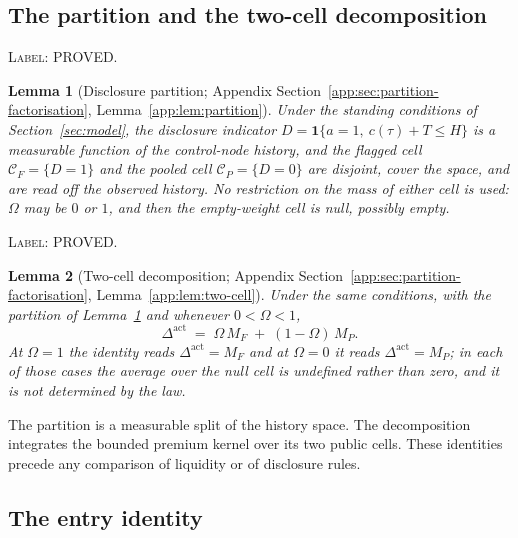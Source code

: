 \documentclass[11pt]{article}
\newtheorem{lemma}{Lemma}
\newcommand{\ind}{\mathbf{1}}
\newcommand{\Dact}{\Delta^{\mathrm{act}}}
\begin{document}
\subsection{The partition and the two-cell decomposition}
\label{sec:partition}

\noindent\textsc{Label: PROVED.}\par
\begin{lemma}[Disclosure partition; Appendix Section~\ref{app:sec:partition-factorisation}, Lemma~\ref{app:lem:partition}]
\label{lem:partition}
Under the standing conditions of Section~\ref{sec:model}, the disclosure indicator
$D = \ind\{a = 1,\ c(\tau) + T \le H\}$ is a measurable function of the control-node history,
and the flagged cell $\mathcal C_F = \{D = 1\}$ and the pooled cell $\mathcal C_P = \{D = 0\}$
are disjoint, cover the space, and are read off the observed history. No restriction on the
mass of either cell is used: $\Omega$ may be $0$ or $1$, and then the empty-weight cell is
null, possibly empty.
\end{lemma}

\noindent\textsc{Label: PROVED.}\par
\begin{lemma}[Two-cell decomposition; Appendix Section~\ref{app:sec:partition-factorisation}, Lemma~\ref{app:lem:two-cell}]
\label{lem:two-cell}
Under the same conditions, with the partition of Lemma~\ref{lem:partition} and whenever
$0 < \Omega < 1$,
\[
  \Dact \;=\; \Omega\,M_F \;+\; (1 - \Omega)\,M_P .
\]
At $\Omega = 1$ the identity reads $\Dact = M_F$ and at $\Omega = 0$ it reads $\Dact = M_P$;
in each of those cases the average over the null cell is undefined rather than zero, and it is
not determined by the law.
\end{lemma}

The partition is a measurable split of the history space. The decomposition integrates the bounded
premium kernel over its two public cells. These identities precede any comparison of liquidity or
of disclosure rules.

\subsection{The entry identity}
\label{sec:entry-identity}
\end{document}
